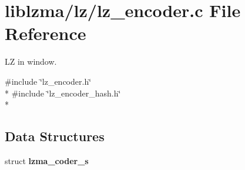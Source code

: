 \section{liblzma/lz/lz\-\_\-encoder.c File Reference}
\label{lz__encoder_8c}


L\-Z in window.  


{\ttfamily \#include \char`\"{}lz\-\_\-encoder.\-h\char`\"{}}\\*
{\ttfamily \#include \char`\"{}lz\-\_\-encoder\-\_\-hash.\-h\char`\"{}}\\*
\subsection*{Data Structures}
\begin{DoxyCompactItemize}
\item 
struct {\bf lzma\-\_\-coder\-\_\-s}
\end{DoxyCompactItemize}

